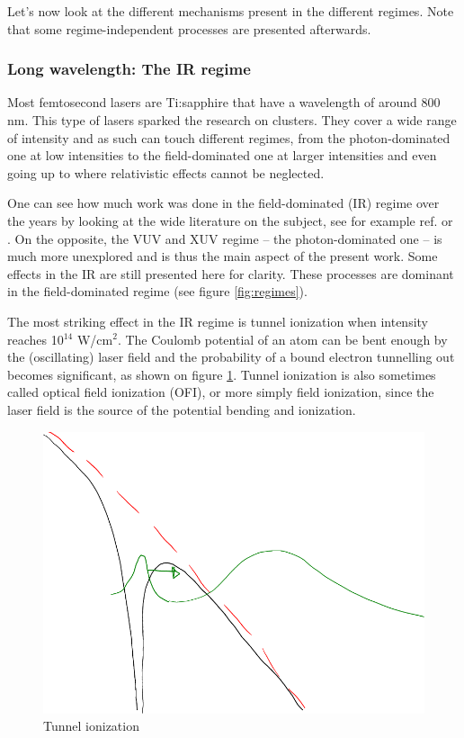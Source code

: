 Let's now look at the different mechanisms present in the different regimes.
Note that some regime-independent processes are presented afterwards.



\subsubsection{Long wavelength: The IR regime}
\label{section:intro:mechanisms:ir}
Most femtosecond lasers are Ti:sapphire that have a wavelength of around 800 nm.
This type of lasers sparked the research on clusters. They cover a wide range of
intensity and as such can touch different regimes, from the photon-dominated
one at low intensities to the field-dominated one at larger intensities and
even going up to where relativistic effects cannot be neglected.

One can see how much work was done in the field-dominated (IR) regime over the
years by looking at the wide literature on the subject, see for example ref.
\cite{Fennel2010} or \cite{Ramunno2008}. On the opposite, the VUV and XUV regime
-- the photon-dominated one -- is much more unexplored and is thus the main
aspect of the present work. Some effects in the IR are still presented here
for clarity. These processes are dominant in the field-dominated regime (see
figure \ref{fig:regimes}).


The most striking effect in the IR regime is tunnel
ionization\cite[Chapter~3]{Brabec2009} when intensity reaches 10$^{14}$ W/cm$^2$.
The Coulomb potential of an atom can be bent enough by the (oscillating) laser
field and the probability of a bound electron tunnelling out becomes significant,
as shown on figure \ref{fig:ionization:tunnel}. Tunnel ionization is also
sometimes called optical field ionization (OFI), or more simply field
ionization, since the laser field is the source of the potential bending and
ionization.

\begin{figure}
 \centering
 \includegraphics[width=0.76\columnwidth]{figures/mockups/ionization_tunnel}
 \caption{\label{fig:ionization:tunnel}Tunnel ionization
 }
\end{figure}

